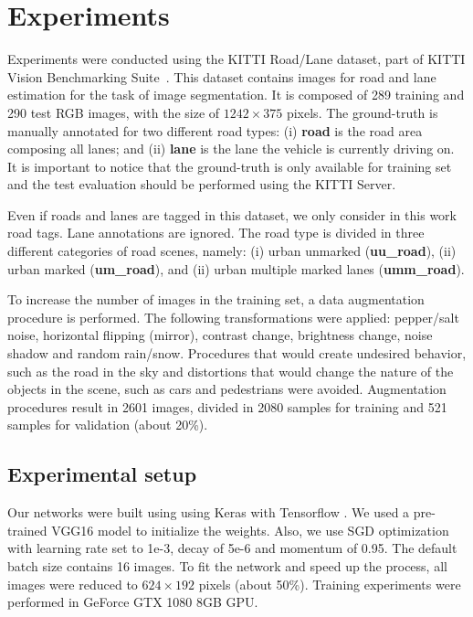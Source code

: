\section{Experiments}
\label{sec:experiments}

Experiments were conducted using the KITTI Road/Lane dataset, part of KITTI Vision Benchmarking Suite~\cite{KITTI}. This dataset  contains  images for road and lane estimation for the task of image segmentation. It is composed of 289 training and 290 test RGB images, with the size of $1242 \times 375$ pixels. The ground-truth is manually annotated for two different road types: (i) \textbf{road} is the road area composing all lanes; and (ii) \textbf{lane} is the lane the vehicle is currently driving on. It is important to notice that the ground-truth is only available for training set and the test evaluation should be performed using the KITTI Server.


Even if roads and lanes are tagged in this dataset, 
we only consider in this work road tags. Lane annotations are ignored. The road type is divided in three different categories of road scenes, namely: (i) urban unmarked (\textbf{uu\_road}), (ii) urban marked (\textbf{um\_road}), and (ii) urban multiple marked lanes (\textbf{umm\_road}).  


To increase the number of images in the training set, a data augmentation procedure is performed. The following transformations were applied: pepper/salt noise, horizontal flipping (mirror), contrast change, brightness change, noise shadow and random rain/snow. Procedures that would create undesired behavior, such as the road in the sky and distortions that would change the nature of the objects in the scene, such as cars and pedestrians were avoided. Augmentation procedures result in 2601 images, divided in 2080 samples for training and 521 samples for validation (about 20\%). 


\subsection{Experimental setup}
   
Our networks were built using using Keras \cite{chollet2015keras} with Tensorflow \cite{tensorflow2015-whitepaper}. We used a pre-trained VGG16 model to initialize the weights. Also, we use SGD optimization with learning rate set to 1e-3, decay of 5e-6 and momentum of 0.95. The default batch size contains 16 images. To fit the network and speed up the process, all images were reduced to $624 \times 192$ pixels (about 50\%). Training experiments were performed in GeForce GTX 1080 8GB GPU.

